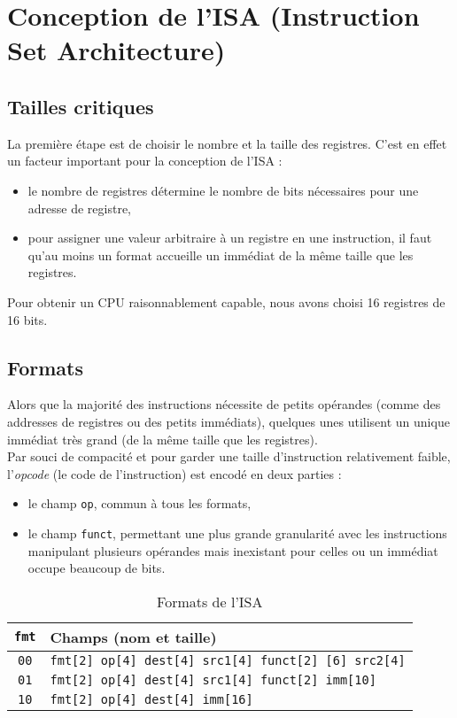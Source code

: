 \chapter{Conception de l'ISA (Instruction Set Architecture)}
\label{ch:isa}

\section{Tailles critiques}

La première étape est de choisir le nombre et la taille des registres. C'est en
effet un facteur important pour la conception de l'ISA :
\begin{itemize}
\item le nombre de registres détermine le nombre de bits nécessaires pour une
    adresse de registre,
\item pour assigner une valeur arbitraire à un registre en une instruction, il
    faut qu'au moins un format accueille un immédiat de la même taille que les
    registres. \\
\end{itemize}

Pour obtenir un CPU raisonnablement capable, nous avons choisi 16 registres de
16 bits.

\section{Formats}

Alors que la majorité des instructions nécessite de petits opérandes (comme des
addresses de registres ou des petits immédiats), quelques unes utilisent un
unique immédiat très grand (de la même taille que les registres). \\

Par souci de compacité et pour garder une taille d'instruction relativement
faible, l'\textit{opcode} (le code de l'instruction) est encodé en deux parties :
\begin{itemize}
\item le champ \texttt{op}, commun à tous les formats,
\item le champ \texttt{funct}, permettant une plus grande granularité avec les
    instructions manipulant plusieurs opérandes mais inexistant pour celles ou
    un immédiat occupe beaucoup de bits.
\end{itemize}

\begin{table}[ht]
    \centering
    \begin{tabular}{cl}
    \toprule
    \texttt{fmt} & Champs (nom et taille) \\
    \midrule
    \texttt{00} & \texttt{fmt[2] op[4] dest[4] src1[4] funct[2] [6] src2[4]} \\
    \texttt{01} & \texttt{fmt[2] op[4] dest[4] src1[4] funct[2] imm[10]} \\
    \texttt{10} & \texttt{fmt[2] op[4] dest[4] imm[16]} \\
    \bottomrule
    \end{tabular}
    \caption{Formats de l'ISA}
    \label{tab:formats}
\end{table}

